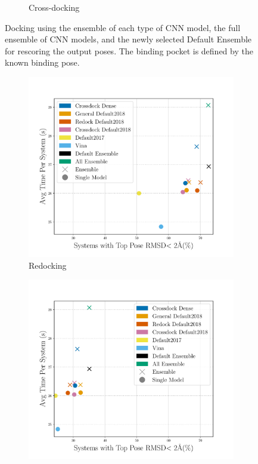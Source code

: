 \documentclass[journal=jcisd8,manuscript=article]{achemso}
\begin{document}
\begin{figure}
\begin{subfigure}[b]{0.48\textwidth}
		\caption{Cross-docking}
		\label{fig:RescoreEnsembleCrossdock}
        \end{subfigure}    
	\caption{Docking using the ensemble of each type of CNN model, the full ensemble of CNN models, and the newly selected Default Ensemble for rescoring the output poses. The binding pocket is defined by the known binding pose.}
	\label{fig:RescoreEnsemble}
\end{figure}    


\begin{figure}    
        \begin{subfigure}[b]{0.48\textwidth}
                \centering
                \includegraphics[width=\textwidth]{figures/redocking/gpu_models_line_rescore.pdf}
                \caption{Redocking}
                \label{fig:OptimalRescRD}
        \end{subfigure}    
        \begin{subfigure}[b]{0.48\textwidth}
                \centering
                \includegraphics[width=\textwidth]{figures/crossdocking/gpu_models_line_rescore.pdf}

\end{subfigure}
\end{figure}
\end{document}
